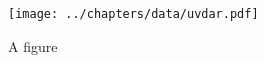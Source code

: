 \documentclass{article}
\begin{document}
\lipsum[1]
\begin{figure}
    \texttt{[image: ../chapters/data/uvdar.pdf]}\caption{A figure}
\end{figure}
\end{document}
